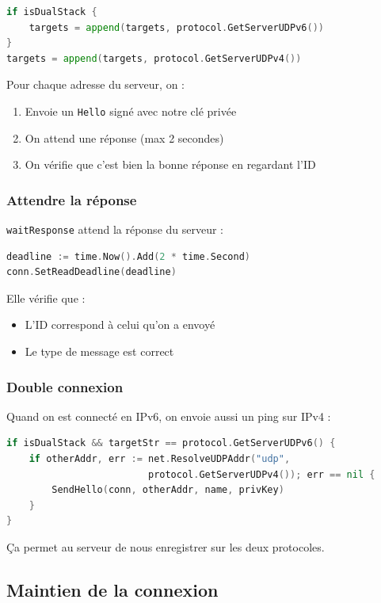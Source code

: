 \documentclass[11pt,a4paper]{report}
\begin{document}
\begin{lstlisting}[language=Go]
if isDualStack {
    targets = append(targets, protocol.GetServerUDPv6())
}
targets = append(targets, protocol.GetServerUDPv4())
\end{lstlisting}

Pour chaque adresse du serveur, on :
\begin{enumerate}
    \item Envoie un \texttt{Hello} signé avec notre clé privée
    \item On attend une réponse (max 2 secondes)
    \item On vérifie que c'est bien la bonne réponse en regardant l'ID
\end{enumerate}

\subsubsection{Attendre la réponse}

\texttt{waitResponse} attend la réponse du serveur :

\begin{lstlisting}[language=Go]
deadline := time.Now().Add(2 * time.Second)
conn.SetReadDeadline(deadline)
\end{lstlisting}

Elle vérifie que :
\begin{itemize}
    \item L'ID correspond à celui qu'on a envoyé
    \item Le type de message est correct
\end{itemize}

\subsubsection{Double connexion}

Quand on est connecté en IPv6, on envoie aussi un ping sur IPv4 :

\begin{lstlisting}[language=Go]
if isDualStack && targetStr == protocol.GetServerUDPv6() {
    if otherAddr, err := net.ResolveUDPAddr("udp", 
                         protocol.GetServerUDPv4()); err == nil {
        SendHello(conn, otherAddr, name, privKey)
    }
}
\end{lstlisting}

Ça permet au serveur de nous enregistrer sur les deux protocoles.

\subsection{Maintien de la connexion}
\end{document}
